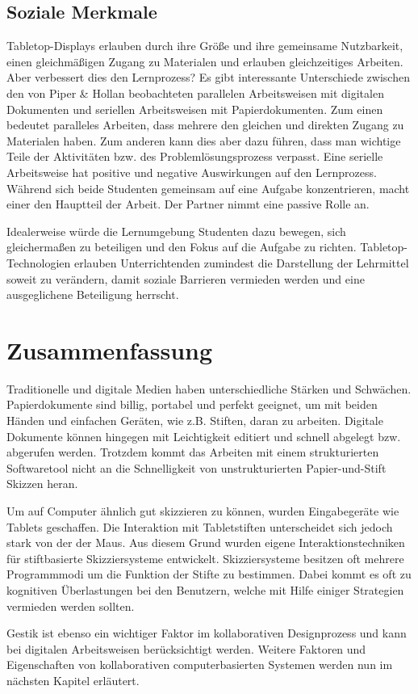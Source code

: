 \subsection{Soziale Merkmale}
Tabletop-Displays erlauben durch ihre Größe und ihre gemeinsame Nutzbarkeit, einen gleichmäßigen Zugang zu Materialen und erlauben gleichzeitiges Arbeiten. Aber verbessert dies den Lernprozess? Es gibt interessante Unterschiede zwischen den von Piper \& Hollan beobachteten parallelen Arbeitsweisen mit digitalen Dokumenten und seriellen Arbeitsweisen mit Papierdokumenten. Zum einen bedeutet paralleles Arbeiten, dass mehrere den gleichen und direkten Zugang zu Materialen haben. Zum anderen kann dies aber dazu führen, dass man wichtige Teile der Aktivitäten bzw. des Problemlösungsprozess verpasst. Eine serielle Arbeitsweise hat positive und negative Auswirkungen auf den Lernprozess. Während sich beide Studenten gemeinsam auf eine Aufgabe konzentrieren, macht einer den Hauptteil der Arbeit. Der Partner nimmt eine passive Rolle an.

\medskip Idealerweise würde die Lernumgebung Studenten dazu bewegen, sich gleichermaßen zu beteiligen und den Fokus auf die Aufgabe zu richten. Tabletop-Technologien erlauben Unterrichtenden zumindest die Darstellung der Lehrmittel soweit zu verändern, damit soziale Barrieren vermieden werden und eine ausgeglichene Beteiligung herrscht. \citep{Piper:2009}

\section*{Zusammenfassung}
Traditionelle und digitale Medien haben unterschiedliche Stärken und Schwächen. Papierdokumente sind billig, portabel und perfekt geeignet, um mit beiden Händen und einfachen Geräten, wie z.B. Stiften, daran zu arbeiten. Digitale Dokumente können hingegen mit Leichtigkeit editiert und schnell abgelegt bzw. abgerufen werden. Trotzdem kommt das Arbeiten mit einem strukturierten Softwaretool nicht an die Schnelligkeit von unstrukturierten Papier-und-Stift Skizzen heran.

Um auf Computer ähnlich gut skizzieren zu können, wurden Eingabegeräte wie Tablets geschaffen. Die Interaktion mit Tabletstiften unterscheidet sich jedoch stark von der der Maus. Aus diesem Grund wurden eigene Interaktionstechniken für stiftbasierte Skizziersysteme entwickelt. Skizziersysteme besitzen oft mehrere Programmmodi um die Funktion der Stifte zu bestimmen. Dabei kommt es oft zu kognitiven Überlastungen bei den Benutzern, welche mit Hilfe einiger Strategien vermieden werden sollten.

Gestik ist ebenso ein wichtiger Faktor im kollaborativen Designprozess und kann bei digitalen Arbeitsweisen berücksichtigt werden. Weitere Faktoren und Eigenschaften von kollaborativen computerbasierten Systemen werden nun im nächsten Kapitel erläutert.